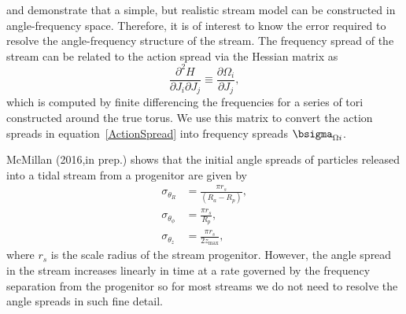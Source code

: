 \documentclass[useAMS,usenatbib,fleqn,a4paper]{mn2e}
\begin{document}
\cite{Bovy2014} and \cite{Sanders2014} demonstrate that a simple, but
realistic stream model can be constructed in angle-frequency space.
Therefore, it is of interest to know the error required to resolve the
angle-frequency structure of the stream. The frequency spread of the stream
can be related to the action spread via the Hessian matrix as
\begin{equation}
\frac{\partial^2 H}{\partial J_i \partial J_j}\equiv \frac{\partial \Omega_i}{\partial J_j},
\end{equation}
which is computed by finite differencing the frequencies for a series of tori
constructed around the true torus. We use this matrix to convert the action
spreads in equation~\eqref{ActionSpread} into frequency spreads
$\bsigma_{\Omega i}$.

McMillan (2016,in prep.) shows that the initial angle spreads of
particles released into a tidal stream from a progenitor are given by
\begin{equation}
\begin{split}
\sigma_{\theta_R} &= \frac{\pi r_s}{(R_a-R_p)},\\
\sigma_{\theta_\phi} &= \frac{\pi r_s}{R_p},\\
\sigma_{\theta_z} &= \frac{\pi r_s}{2 z_\mathrm{max}},
\end{split}
\end{equation}
where $r_s$ is the scale radius of the stream progenitor. However, the angle
spread in the stream increases linearly in time at a rate governed by the
frequency separation from the progenitor so for most streams we do not need
to resolve the angle spreads in such fine detail.

\label{lastpage}
\end{document}
